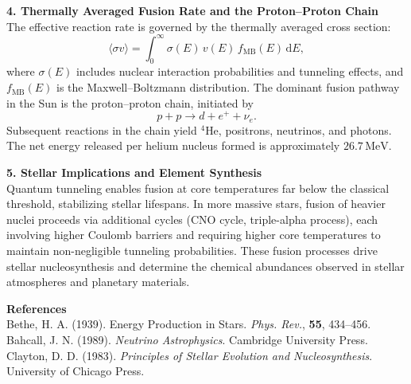 \begin{technical}
\vspace{0.7em}
\textbf{4. Thermally Averaged Fusion Rate and the Proton–Proton Chain}\\[0.5em]
The effective reaction rate is governed by the thermally averaged cross section:
\[
\langle \sigma v \rangle = \int_0^\infty \sigma(E)\, v(E)\, f_\text{MB}(E)\, \mathrm{d}E,
\]
where \(\sigma(E)\) includes nuclear interaction probabilities and tunneling effects, and \(f_\text{MB}(E)\) is the Maxwell–Boltzmann distribution. The dominant fusion pathway in the Sun is the proton–proton chain, initiated by
\[
p + p \to d + e^+ + \nu_e.
\]
Subsequent reactions in the chain yield \( ^4\text{He} \), positrons, neutrinos, and photons. The net energy released per helium nucleus formed is approximately \(26.7\,\text{MeV}\).

\vspace{0.7em}
\textbf{5. Stellar Implications and Element Synthesis}\\[0.5em]
Quantum tunneling enables fusion at core temperatures far below the classical threshold, stabilizing stellar lifespans. In more massive stars, fusion of heavier nuclei proceeds via additional cycles (CNO cycle, triple-alpha process), each involving higher Coulomb barriers and requiring higher core temperatures to maintain non-negligible tunneling probabilities. These fusion processes drive stellar nucleosynthesis and determine the chemical abundances observed in stellar atmospheres and planetary materials.

\vspace{0.5em}
\textbf{References}\\
Bethe, H. A. (1939). Energy Production in Stars. \textit{Phys. Rev.}, \textbf{55}, 434–456.\\
Bahcall, J. N. (1989). \textit{Neutrino Astrophysics}. Cambridge University Press.\\
Clayton, D. D. (1983). \textit{Principles of Stellar Evolution and Nucleosynthesis}. University of Chicago Press.
\end{technical}

